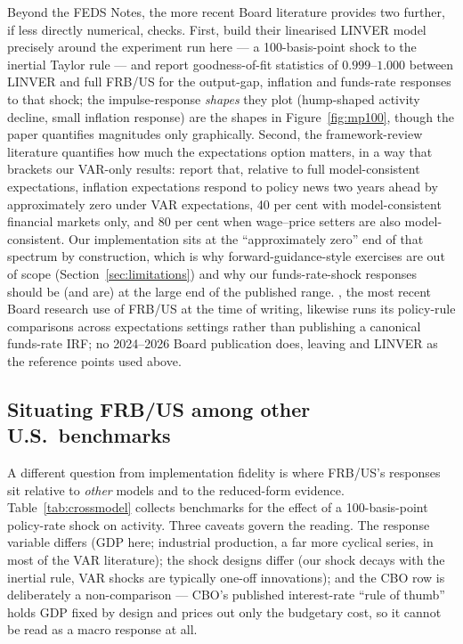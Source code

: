 Beyond the FEDS Notes, the more recent Board literature provides two further, if less directly numerical, checks. First, \citet{brayton2022linver} build their linearised LINVER model precisely around the experiment run here --- a 100-basis-point shock to the inertial Taylor rule --- and report goodness-of-fit statistics of $0.999$--$1.000$ between LINVER and full FRB/US for the output-gap, inflation and funds-rate responses to that shock; the impulse-response \emph{shapes} they plot (hump-shaped activity decline, small inflation response) are the shapes in Figure~\ref{fig:mp100}, though the paper quantifies magnitudes only graphically. Second, the framework-review literature quantifies how much the expectations option matters, in a way that brackets our VAR-only results: \citet{hebden2020makeup} report that, relative to full model-consistent expectations, inflation expectations respond to policy news two years ahead by approximately zero under VAR expectations, 40 per cent with model-consistent financial markets only, and 80 per cent when wage--price setters are also model-consistent. Our implementation sits at the ``approximately zero'' end of that spectrum by construction, which is why forward-guidance-style exercises are out of scope (Section~\ref{sec:limitations}) and why our funds-rate-shock responses should be (and are) at the large end of the published range. \citet{kiley2025anchoring}, the most recent Board research use of FRB/US at the time of writing, likewise runs its policy-rule comparisons across expectations settings rather than publishing a canonical funds-rate IRF; no 2024--2026 Board publication does, leaving \citet{laforte2018changes} and LINVER as the reference points used above.

\subsection{Situating FRB/US among other U.S.\ benchmarks}
\label{sec:cmp-crossmodel}

A different question from implementation fidelity is where FRB/US's responses sit relative to \emph{other} models and to the reduced-form evidence. Table~\ref{tab:crossmodel} collects benchmarks for the effect of a 100-basis-point policy-rate shock on activity. Three caveats govern the reading. The response variable differs (GDP here; industrial production, a far more cyclical series, in most of the VAR literature); the shock designs differ (our shock decays with the inertial rule, VAR shocks are typically one-off innovations); and the CBO row is deliberately a non-comparison --- CBO's published interest-rate ``rule of thumb'' holds GDP fixed by design and prices out only the budgetary cost, so it cannot be read as a macro response at all.

